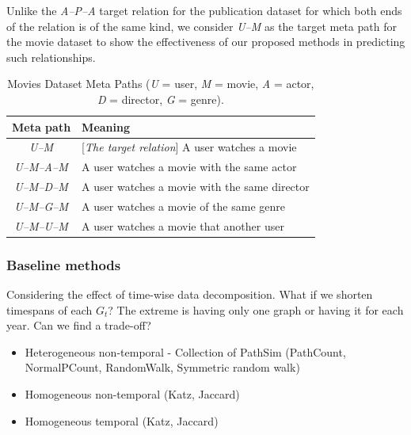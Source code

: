 Unlike the \textit{A--P--A} target relation for the publication dataset for which both ends of the relation is of the same kind, we consider \textit{U--M} as the target meta path for the movie dataset to show the effectiveness of our proposed methods in predicting such relationships.

\begin{table}[h]
\centering
\caption{Movies Dataset Meta Paths (\textit{U} = user, \textit{M} = movie, \textit{A} = actor, \textit{D} = director, \textit{G} = genre).}
\label{table_movies}
\begin{tabular}{|c|l|} \hline
\textbf{Meta path} & \textbf{Meaning} \\ \hline
\textit{U--M} & [\textit{The target relation}] A user watches a movie \\ \hline

\textit{U--M--A--M} & A user watches a movie with the same actor \\ \hline
\textit{U--M--D--M} & A user watches a movie with the same director \\ \hline
\textit{U--M--G--M} & A user watches a movie of the same genre \\ \hline
\textit{U--M--U--M} & A user watches a movie that another user  \\ \hline

\end{tabular}
\end{table}


\subsubsection{Baseline methods}

Considering the effect of time-wise data decomposition. What if we shorten timespans of each $G_t$? The extreme is having only one graph or having it for each year. Can we find a trade-off?

\begin{itemize}
    \item  Heterogeneous non-temporal - Collection of PathSim (PathCount, NormalPCount, RandomWalk, Symmetric random walk)
    \item  Homogeneous non-temporal (Katz, Jaccard)
    \item  Homogeneous temporal (Katz, Jaccard)
\end{itemize}

